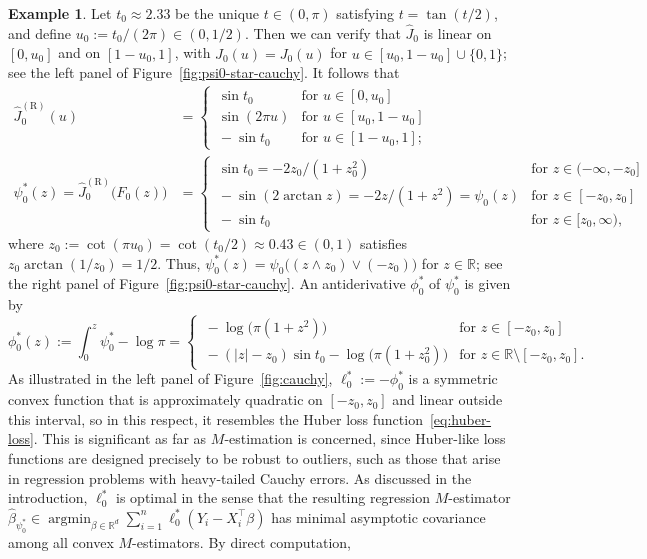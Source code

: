 \documentclass[a4paper]{article}
\newcommand{\R}{\mathbb{R}}
\DeclareMathOperator*{\argmin}{argmin}
\theoremstyle{definition}
\newtheorem{example}[theorem]{Example}
\begin{document}
\begin{example}
Let $t_0 \approx 2.33$ be the unique $t \in (0,\pi)$ satisfying $t = \tan(t/2)$,
and define $u_0 := t_0/(2\pi) \in (0,1/2)$. Then we can verify that $\hat{J}_0$ is linear on $[0,u_0]$ and on $[1 - u_0,1]$, with $\hat{J}_0(u) = J_0(u)$ for $u \in [u_0, 1 - u_0] \cup \{0,1\}$; see the left panel of Figure~\ref{fig:psi0-star-cauchy}. It follows that
\begin{align*}
\hat{J}_0^{(\mathrm{R})}(u) &= 
\begin{cases}
\,\sin t_0 &\text{for }u \in [0,u_0] \\
\,\sin(2\pi u) &\text{for }u \in [u_0,1 - u_0] \\
\,-\sin t_0 &\text{for }u \in [1 - u_0,1];
\end{cases}\\
\psi_0^*(z) = \hat{J}_0^{(\mathrm{R})}\bigl(F_0(z)\bigr) &= 
\begin{cases}
\,\sin t_0 = -2z_0/(1 + z_0^2) &\text{for }z \in (-\infty,-z_0] \\
\,-\sin(2\arctan z) = -2z/(1 + z^2) = \psi_0(z) &\text{for }z \in [-z_0,z_0] \\
\,-\sin t_0 &\text{for }z \in [z_0,\infty),
\end{cases}
\end{align*}
where $z_0 := \cot(\pi u_0) = \cot(t_0/2)\approx 0.43\in (0,1)$ satisfies $z_0\arctan(1/z_0) = 1/2$. Thus, $\psi_0^*(z) = \psi_0\bigl((z \wedge z_0) \vee (-z_0)\bigr)$ for $z \in \R$; see the right panel of Figure~\ref{fig:psi0-star-cauchy}. An antiderivative $\phi_0^*$ of $\psi_0^*$ is given by
\[
\phi_0^*(z) := \int_0^z \psi_0^* - \log\pi = 
\begin{cases}
\,-\log\bigl(\pi(1 + z^2)\bigr) &\text{for }z \in [-z_0,z_0] \\
\,-(|z| - z_0)\sin t_0 - \log\bigl(\pi(1 + z_0^2)\bigr) &\text{for }z \in \R \setminus [-z_0,z_0].
\end{cases}
\]
As illustrated in the left panel of Figure~\ref{fig:cauchy}, $\ell_0^* := -\phi_0^*$ is a symmetric convex function that is approximately quadratic on $[-z_0,z_0]$ and linear outside this interval, so in this respect, it resembles the Huber loss function~\eqref{eq:huber-loss}. This is significant as far as $M$-estimation is concerned, since Huber-like loss functions are designed precisely to be robust to outliers, such as those that arise in regression problems with heavy-tailed Cauchy errors. As discussed in the introduction, $\ell_0^*$ is optimal in the sense that the resulting regression $M$-estimator $\hat{\beta}_{\psi_0^*} \in \argmin_{\beta \in \R^d}\sum_{i=1}^n \ell_0^*(Y_i - X_i^\top\beta)$ has minimal asymptotic covariance among all convex $M$-estimators. By direct computation, 

\end{example}
\end{document}

